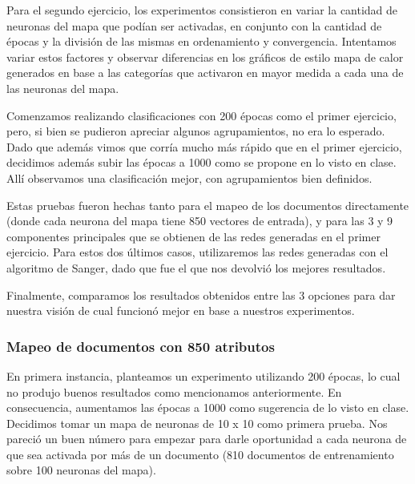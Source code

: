 Para el segundo ejercicio, los experimentos consistieron en variar la cantidad de neuronas del mapa que podían ser activadas, en conjunto con la cantidad de épocas y la división de las mismas en ordenamiento y convergencia. Intentamos variar estos factores y observar diferencias en los gráficos de estilo mapa de calor generados en base a las categorías que activaron en mayor medida a cada una de las neuronas del mapa.

Comenzamos realizando clasificaciones con 200 épocas como el primer ejercicio, pero, si bien se pudieron apreciar algunos agrupamientos, no era lo esperado. Dado que además vimos que corría mucho más rápido que en el primer ejercicio, decidimos además subir las épocas a 1000 como se propone en lo visto en clase. Allí observamos una clasificación mejor, con agrupamientos bien definidos.

Estas pruebas fueron hechas tanto para el mapeo de los documentos directamente (donde cada neurona del mapa tiene 850 vectores de entrada), y para las 3 y 9 componentes principales que se obtienen de las redes generadas en el primer ejercicio. Para estos dos últimos casos, utilizaremos las redes generadas con el algoritmo de Sanger, dado que fue el que nos devolvió los mejores resultados.

Finalmente, comparamos los resultados obtenidos entre las 3 opciones para dar nuestra visión de cual funcionó mejor en base a nuestros experimentos.

\subsubsection{Mapeo de documentos con 850 atributos}

En primera instancia, planteamos un experimento utilizando 200 épocas, lo cual no produjo buenos resultados como mencionamos anteriormente. En consecuencia, aumentamos las épocas a 1000 como sugerencia de lo visto en clase. Decidimos tomar un mapa de neuronas de 10 x 10 como primera prueba. Nos pareció un buen número para empezar para darle oportunidad a cada neurona de que sea activada por más de un documento (810 documentos de entrenamiento sobre 100 neuronas del mapa). 

